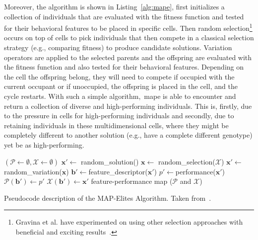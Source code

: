 Moreover, the algorithm is shown in Listing~\ref{alg:mape}, first initializes a collection of individuals that are evaluated with the fitness function and tested for their behavioral features to be placed in specific cells. Then random selection\footnote{Gravina et al. have experimented on using other selection approaches with beneficial and exciting results~\cite{Gravina2019-blendingNotionsDiversity}.} occurs on top of cells to pick individuals that then compete in a classical selection strategy (e.g., comparing fitness) to produce candidate solutions. Variation operators are applied to the selected parents and the offspring are evaluated with the fitness function and also tested for their behavioral features. Depending on the cell the offspring belong, they will need to compete if occupied with the current occupant or if unoccupied, the offspring is placed in the cell, and the cycle restarts. With such a simple algorithm,~\acrshort{mape} is able to encounter and return a collection of diverse and high-performing individuals. This is, firstly, due to the pressure in cells for high-performing individuals and secondly, due to retaining individuals in these multidimensional cells, where they might be completely different to another solution (e.g., have a complete different genotype) yet be as high-performing.


\begin{algorithm}
\begin{algorithmic}
\State $(\mathcal{P} \leftarrow \emptyset, \mathcal{X} \leftarrow \emptyset)$
  \State $\mathbf{x'}\leftarrow $ random\_solution()  
\Else 
  \State $\mathbf{x}\leftarrow $ random\_selection($\mathcal{X}$) 
  \State $\mathbf{x'}\leftarrow $ random\_variation($\mathbf{x}$) 
\EndIf
\State $\mathbf{b'}\leftarrow $feature\_descriptor($\mathbf{x'}$) 
\State $p'\leftarrow $performance($\mathbf{x'}$) 
\State $\mathcal{P}(\mathbf{b'})\leftarrow p'$ 
\State $\mathcal{X}(\mathbf{b'})\leftarrow \mathbf{x'}$ 
\EndIf
\EndFor
\State \Return feature-performance map ($\mathcal{P}$ and $\mathcal{X}$)
\EndProcedure
\end{algorithmic}
\caption{Pseudocode description of the MAP-Elites Algorithm. Taken from~\cite{Mouret2015}.}
\label{alg:mape}
\end{algorithm}


